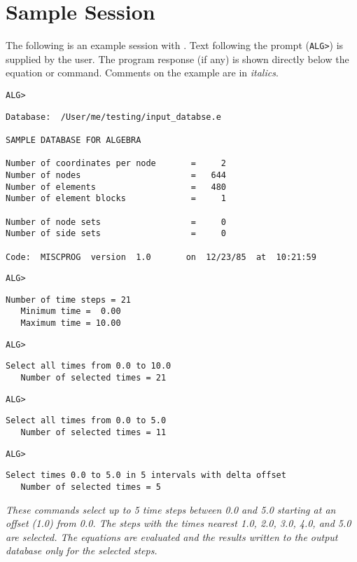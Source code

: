 \chapter{Sample Session} \label{appx:example}

The following is an example session with \caps{\PROGRAM}. Text following
the \caps{\PROGRAM} prompt (\verb|ALG>|) is supplied by the user. The
program response (if any) is shown directly below the equation or
command. Comments on the example are in {\em italics}.

\newenvironment{comments} {\em}{}

\verb|ALG>| 
\begin{verbatim}
Database:  /User/me/testing/input_databse.e

SAMPLE DATABASE FOR ALGEBRA

Number of coordinates per node       =     2
Number of nodes                      =   644
Number of elements                   =   480
Number of element blocks             =     1

Number of node sets                  =     0
Number of side sets                  =     0

Code:  MISCPROG  version  1.0       on  12/23/85  at  10:21:59
\end{verbatim}

\verb|ALG>| 
\begin{verbatim}
Number of time steps = 21
   Minimum time =  0.00
   Maximum time = 10.00
\end{verbatim}

\newpage
\verb|ALG>| 
\vspace{-\medskipamount}
\begin{verbatim}
Select all times from 0.0 to 10.0
   Number of selected times = 21
\end{verbatim}
\verb|ALG>| 
\vspace{-\medskipamount}
\begin{verbatim}
Select all times from 0.0 to 5.0
   Number of selected times = 11
\end{verbatim}
\verb|ALG>| 
\vspace{-\medskipamount}
\begin{verbatim}
Select times 0.0 to 5.0 in 5 intervals with delta offset
   Number of selected times = 5
\end{verbatim}

\begin{comments}
These commands select up to 5 time steps between 0.0 and 5.0 starting at
an offset (1.0) from 0.0. The steps with the times nearest 1.0, 2.0,
3.0, 4.0, and 5.0 are selected. The equations are evaluated and the
results written to the output database only for the selected steps.
\end{comments}

